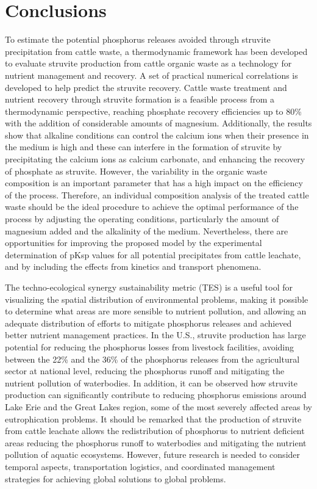 \documentclass[10pt,a4paper]{article}
\begin{document}
\section{Conclusions} \label{conclusions}
To estimate the potential phosphorus releases avoided through struvite precipitation from cattle waste, a thermodynamic framework has been developed to evaluate struvite production from cattle organic waste as a technology for nutrient management and recovery. A set of practical numerical correlations is developed to help predict the struvite recovery. Cattle waste treatment and nutrient recovery through struvite formation is a feasible process from a thermodynamic perspective, reaching phosphate recovery efficiencies up to 80\% with the addition of considerable amounts of magnesium. Additionally, the results show that alkaline conditions can control the calcium ions when their presence in the medium is high and these can interfere in the formation of struvite by precipitating the calcium ions as calcium carbonate, and enhancing the recovery of phosphate as struvite. However, the variability in the organic waste composition is an important parameter that has a high impact on the efficiency of the process. Therefore, an individual composition analysis of the treated cattle waste should be the ideal procedure to achieve the optimal performance of the process by adjusting the operating conditions, particularly the amount of magnesium added and the alkalinity of the medium. Nevertheless, there are opportunities for improving the proposed model by the experimental determination of pKsp values for all potential precipitates from cattle leachate, and by including the effects from kinetics and transport phenomena. 

The techno-ecological synergy sustainability metric (TES) is a useful tool for visualizing the spatial distribution of environmental problems, making it possible to determine what areas are  more sensible to nutrient pollution, and allowing an adequate distribution of efforts to mitigate phosphorus releases and achieved better nutrient management practices. In the U.S., struvite production has large potential for reducing the phosphorus losses from livestock facilities, avoiding between the 22\% and the 36\% of the phosphorus releases from the agricultural sector at national level, reducing the phosphorus runoff and mitigating the nutrient pollution of waterbodies. In addition, it can be observed how struvite production can significantly contribute to reducing phosphorus emissions around Lake Erie and the Great Lakes region, some of the most severely affected areas by eutrophication problems. It should be remarked that the production of struvite from cattle leachate allows the redistribution of phosphorus to nutrient deficient areas reducing the phosphorus runoff to waterbodies and mitigating the nutrient pollution of aquatic ecosystems. However, future research is needed to consider temporal aspects, transportation logistics, and coordinated management strategies for achieving global solutions to global problems. 
\end{document}
